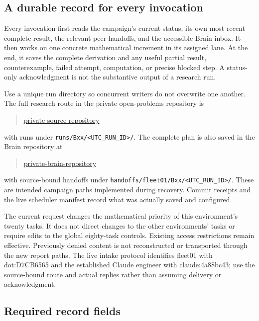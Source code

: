 \documentclass[11pt]{article}
\begin{document}
\subsection{A durable record for every invocation}

Every invocation first reads the campaign's current status, its own most recent complete result, the relevant peer handoffs, and the accessible Brain inbox. It then works on one concrete mathematical increment in its assigned lane. At the end, it saves the complete derivation and any useful partial result, counterexample, failed attempt, computation, or precise blocked step. A status-only acknowledgment is not the substantive output of a research run.

Use a unique run directory so concurrent writers do not overwrite one another. The full research route in the private open-problems repository is
\begin{quote}\small
\url{private-source-repository}
\end{quote}
with runs under \texttt{runs/Bxx/<UTC\_RUN\_ID>/}. The complete plan is also saved in the Brain repository at
\begin{quote}\small
\url{private-brain-repository}
\end{quote}
with source-bound handoffs under \texttt{handoffs/fleet01/Bxx/<UTC\_RUN\_ID>/}. These are intended campaign paths implemented during recovery. Commit receipts and the live scheduler manifest record what was actually saved and configured.

The current request changes the mathematical priority of this environment's twenty tasks. It does not direct changes to the other environments' tasks or require edits to the global eighty-task controls. Existing access restrictions remain effective. Previously denied content is not reconstructed or transported through the new report paths. The live intake protocol identifies fleet01 with dot:D7CB6565 and the established Claude engineer with claude:4a88bc43; use the source-bound route and actual replies rather than assuming delivery or acknowledgment.

\subsection{Required record fields}
\end{document}
